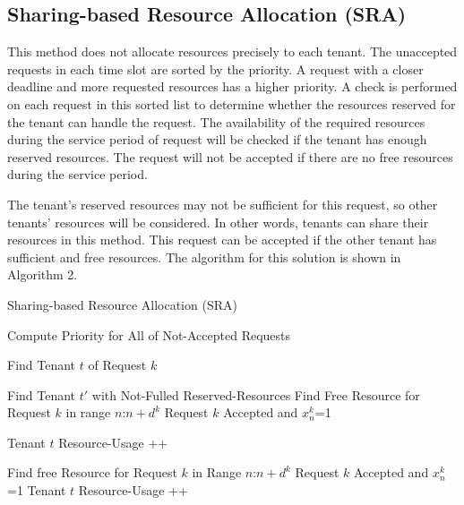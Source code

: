 \documentclass[conference]{IEEEtran}
\begin{document}
\subsection{Sharing-based Resource Allocation (SRA)}
This method does not allocate resources precisely to each tenant. The unaccepted requests in each time slot are sorted by the priority. A request with a closer deadline and more requested resources has a higher priority. A check is performed on each request in this sorted list to determine whether the resources reserved for the tenant can handle the request. The availability of the required resources during the service period of request will be checked if the tenant has enough reserved resources. The request will not be accepted if there are no free resources during the service period.

The tenant's reserved resources may not be sufficient for this request, so other tenants' resources will be considered. In other words, tenants can share their resources in this method. This request can be accepted if the other tenant has sufficient and free resources. The algorithm for this solution is shown in Algorithm 2.

\begin{algorithm}
\caption{Sharing-based Resource Allocation (SRA)}

{
Compute Priority for All of Not-Accepted Requests\;
  { Find Tenant $t$ of Request $k$\;
   {
    Find Tenant $t'$ with Not-Fulled Reserved-Resources\;
    Find Free Resource for Request $k$ in range $n$:$n+d^k$\;
      {Request $k$ Accepted and $x_{n}^{k}$=1\;
         }

       { Tenant $t$ Resource-Usage ++\; }
   }
   {
       Find free Resource for Request $k$ in Range $n$:$n+d^k$\;
          { Request $k$ Accepted and $x_{n}^{k}$=1\;
           }      
      { Tenant $t$ Resource-Usage ++\; }
      
    }
}}
\end{algorithm}
\end{document}
